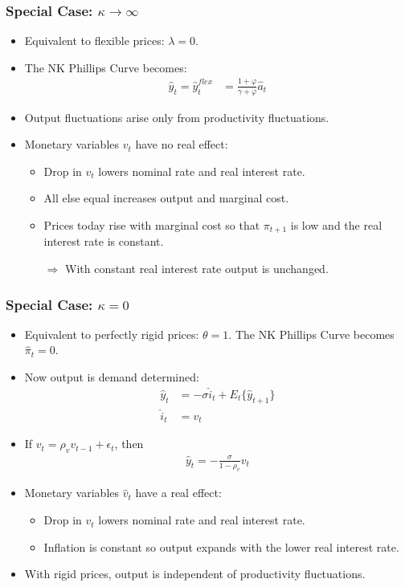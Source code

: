 \documentclass[11pt,aspectratio=169,xcolor={dvipsnames},hyperref={pdftex,pdfpagemode=UseNone,hidelinks,pdfdisplaydoctitle=true},usepdftitle=false]{beamer}
\begin{document}
\begin{frame}
\frametitle{Special Case: $\kappa\rightarrow\infty$}
\begin{itemize}
	\item Equivalent to flexible prices: $\lambda=0$.
	\item The NK Phillips Curve becomes:
	\begin{align*}
		\hat{y}_t = \hat{y}_t^{flex}&=\frac{1+\varphi}{\gamma+\varphi}\hat{a}_t 
	\end{align*}
	\item Output fluctuations arise only from productivity fluctuations.
	\item Monetary variables $v_t$ have no real effect:
	\begin{itemize}
		\item Drop in $v_t$ lowers nominal rate and real interest rate.
		\item All else equal increases output and marginal cost.
		\item Prices today rise with marginal cost so that $\pi_{t+1}$ is low and the real interest rate is constant.
		\item[$\Rightarrow$] With constant real interest rate output is unchanged.
	\end{itemize}
\end{itemize}
\end{frame}

\begin{frame}
\frametitle{Special Case: $\kappa=0$}
\begin{itemize}
	\item Equivalent to perfectly rigid prices: $\theta=1$.  The NK Phillips Curve becomes $\hat{\pi}_t=0$.
	\item Now output is demand determined:
	\begin{align*}
		\hat{y}_t &=-\sigma\hat{i}_t +E_t\{\hat{y}_{t+1}\} \\
		\hat{i}_t&=v_t 
	\end{align*}
	\item If $v_t = \rho_v v_{t-1}+\epsilon_t$, then
	\begin{align*}
		\hat{y}_t = -\frac{\sigma}{1-\rho_v}v_t
	\end{align*}
	\item Monetary variables $\hat{v}_t$ have a real effect:
	\begin{itemize}
		\item Drop in $v_t$ lowers nominal rate and real interest rate.
		\item Inflation is constant so output expands with the lower real interest rate.
	\end{itemize}
	\item With rigid prices, output is independent of productivity fluctuations.
\end{itemize}
\end{frame}
\end{document}
